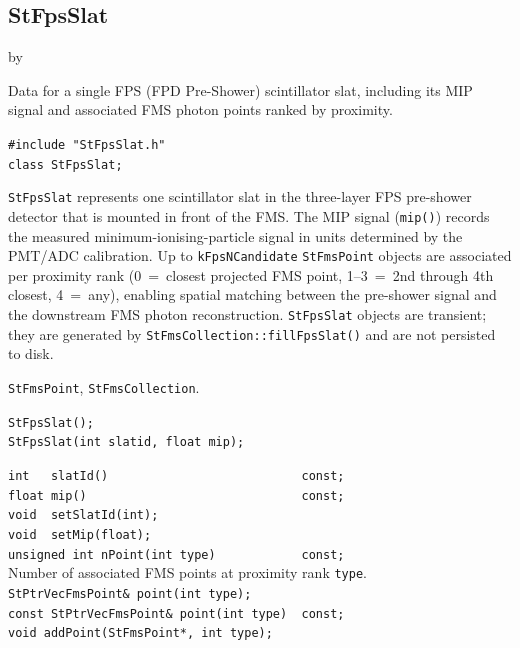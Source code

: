 \documentclass[twoside]{article}
\newcommand{\entrylabel}[1]{\mbox{\textbf{{#1}}}\hfil}%
\newenvironment{entry}
{\begin{list}{}%
    {\renewcommand{\makelabel}{\entrylabel}%
     \setlength{\labelwidth}{90pt}%
     \setlength{\leftmargin}{\labelwidth}
     \advance\leftmargin by \labelsep%
      }%
    }%
  {\end{list}}
\newcommand{\Entrylabel}[1]%
{\raisebox{0pt}[1ex][0pt]{\makebox[\labelwidth][l]%
    {\parbox[t]{\labelwidth}{\hspace{0pt}\textbf{{#1}}}}}}
\newenvironment{Entry}%
{\renewcommand{\entrylabel}{\Entrylabel}\begin{entry}}%
  {\end{entry}}
\begin{document}
\subsection{StFpsSlat}
\label{sec:StFpsSlat}
\begin{Entry}
\item[Summary]
    Data for a single FPS (FPD Pre-Shower) scintillator slat, including its
    MIP signal and associated FMS photon points ranked by proximity.

\item[Synopsis]
    \verb+#include "StFpsSlat.h"+\\
    \verb+class StFpsSlat;+\\

\item[Description]
    \texttt{StFpsSlat} represents one scintillator slat in the three-layer
    FPS pre-shower detector that is mounted in front of the FMS.  The MIP
    signal (\texttt{mip()}) records the measured minimum-ionising-particle
    signal in units determined by the PMT/ADC calibration.  Up to
    \texttt{kFpsNCandidate} \texttt{StFmsPoint} objects are associated per
    proximity rank (0~=~closest projected FMS point, 1--3~=~2nd through 4th
    closest, 4~=~any), enabling spatial matching between the pre-shower
    signal and the downstream FMS photon reconstruction.
    \texttt{StFpsSlat} objects are transient; they are generated by
    \texttt{StFmsCollection::fillFpsSlat()} and are not persisted to disk.

\item[Related Classes]
    \texttt{StFmsPoint}, \texttt{StFmsCollection}.

\item[Public\\ Constructors]
    \verb+StFpsSlat();+\\
    \verb+StFpsSlat(int slatid, float mip);+\\

\item[Public Member\\ Functions]
    \verb+int   slatId()                           const;+\\
    \verb+float mip()                              const;+\\
    \verb+void  setSlatId(int);+\\
    \verb+void  setMip(float);+\\
    \verb+unsigned int nPoint(int type)            const;+\\
        Number of associated FMS points at proximity rank \verb+type+.\\
    \verb+StPtrVecFmsPoint& point(int type);+\\
    \verb+const StPtrVecFmsPoint& point(int type)  const;+\\
    \verb+void addPoint(StFmsPoint*, int type);+\\
\end{Entry}
\clearpage
\end{document}
